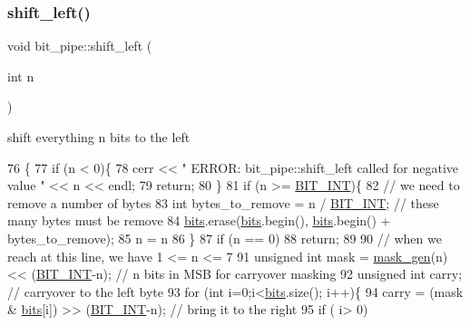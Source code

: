 \subsubsection{\texorpdfstring{shift\+\_\+left()}{shift\_left()}}
{\footnotesize\ttfamily void bit\+\_\+pipe\+::shift\+\_\+left (\begin{DoxyParamCaption}\item[{int}]{n }\end{DoxyParamCaption})}



shift everything n bits to the left 


\begin{DoxyCode}
76                               \{
77   \textcolor{keywordflow}{if} (n < 0)\{
78     cerr << \textcolor{stringliteral}{" ERROR: bit\_pipe::shift\_left called for negative value "} << n << endl;
79     \textcolor{keywordflow}{return};
80   \}
81   \textcolor{keywordflow}{if} (n >= \hyperlink{bitstream_8h_afcadf5aa65c5159bfb96c4d82ebc0a5d}{BIT\_INT})\{
82     \textcolor{comment}{// we need to remove a number of bytes}
83     \textcolor{keywordtype}{int} bytes\_to\_remove = n / \hyperlink{bitstream_8h_afcadf5aa65c5159bfb96c4d82ebc0a5d}{BIT\_INT}; \textcolor{comment}{// these many bytes must be remove}
84     \hyperlink{classbit__pipe_a86f38af1e9736b053728033490476b50}{bits}.erase(\hyperlink{classbit__pipe_a86f38af1e9736b053728033490476b50}{bits}.begin(), \hyperlink{classbit__pipe_a86f38af1e9736b053728033490476b50}{bits}.begin() + bytes\_to\_remove);
85     n = n %
86   \}
87   \textcolor{keywordflow}{if} (n == 0)
88     \textcolor{keywordflow}{return};
89 
90   \textcolor{comment}{// when we reach at this line, we have 1 <= n <= 7}
91   \textcolor{keywordtype}{unsigned} \textcolor{keywordtype}{int} mask = \hyperlink{bitstream_8cpp_a6364b017a9400a38f7a994376bb3ebee}{mask\_gen}(n) << (\hyperlink{bitstream_8h_afcadf5aa65c5159bfb96c4d82ebc0a5d}{BIT\_INT}-n); \textcolor{comment}{// n bits in MSB for carryover masking}
92   \textcolor{keywordtype}{unsigned} \textcolor{keywordtype}{int} carry; \textcolor{comment}{// carryover to the left byte}
93   \textcolor{keywordflow}{for} (\textcolor{keywordtype}{int} i=0;i<\hyperlink{classbit__pipe_a86f38af1e9736b053728033490476b50}{bits}.size(); i++)\{
94     carry = (mask & \hyperlink{classbit__pipe_a86f38af1e9736b053728033490476b50}{bits}[i]) >> (\hyperlink{bitstream_8h_afcadf5aa65c5159bfb96c4d82ebc0a5d}{BIT\_INT}-n); \textcolor{comment}{// bring it to the right}
95     \textcolor{keywordflow}{if} ( i> 0)

\end{DoxyCode}
